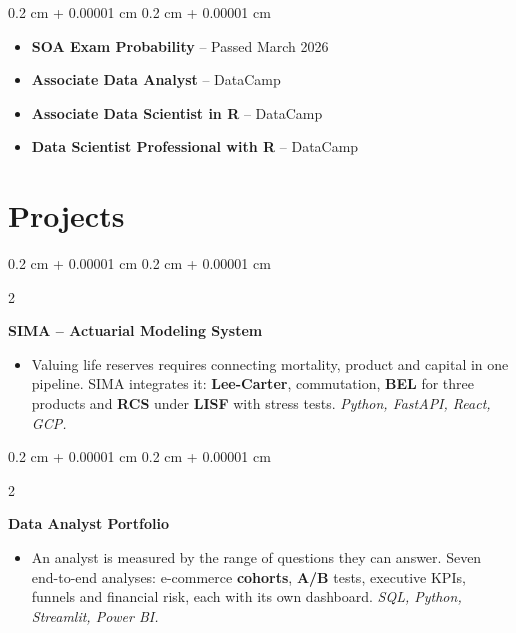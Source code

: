 \documentclass[10pt, letterpaper]{article}
\newenvironment{highlights}{
    \begin{itemize}[
        topsep=0.02 cm,
        parsep=0.05 cm,
        partopsep=0pt,
        itemsep=0pt,
        leftmargin=0.4 cm + 10pt
    ]
}{
    \end{itemize}
}
\newenvironment{highlightsforbulletentries}{
    \begin{itemize}[
        topsep=0.02 cm,
        parsep=0.02 cm,
        partopsep=0pt,
        itemsep=0pt,
        leftmargin=10pt
    ]
}{
    \end{itemize}
}
\newenvironment{onecolentry}{
    \begin{adjustwidth}{
        0.2 cm + 0.00001 cm
    }{
        0.2 cm + 0.00001 cm
    }
}{
    \end{adjustwidth}
}
\newenvironment{twocolentrynarrow}[2][]{
    \onecolentry
    \def\secondColumn{#2}
    \setcolumnwidth{\fill, 2.2 cm}
    \begin{paracol}{2}
}{
    \switchcolumn \raggedleft \secondColumn
    \end{paracol}
    \endonecolentry
}
\newcommand{\hl}[1]{\textcolor{primaryColor}{\textbf{#1}}}
\let\hrefWithoutArrow\href
\renewcommand{\href}[2]{\hrefWithoutArrow{#1}{\ifthenelse{\equal{#2}{}}{ }{#2 }\raisebox{.15ex}{\footnotesize \faExternalLink*}}}
\begin{document}
    \begin{onecolentry}
        \begin{highlightsforbulletentries}
            \item \textbf{SOA Exam Probability} -- Passed March 2026 \href{https://drive.google.com/file/d/1rt3emgBnPpQi7NiXkBQeA5WwJTV0JuAf/view?usp=sharing}{}
            \item \textbf{Associate Data Analyst} -- DataCamp \href{https://drive.google.com/drive/folders/1-QUuVH3zPBPsl6RhUvuUWxpZkP1i8TYb?usp=sharing}{}
            \item \textbf{Associate Data Scientist in R} -- DataCamp \href{https://drive.google.com/file/d/1xVLk15A1LBbyXH1fZnd4eBTaJ4d8FLLO/view?usp=drive_link}{}
            \item \textbf{Data Scientist Professional with R} -- DataCamp \href{https://drive.google.com/file/d/1Woe6xqxofloFZ9uM2f5VsdGxY-WQWCRI/view?usp=drive_link}{}
        \end{highlightsforbulletentries}
    \end{onecolentry}


    \section{Projects}

\begin{twocolentrynarrow}{\href{https://sima-d3qj5vwxtq-uc.a.run.app}{app live}}
    \textbf{SIMA -- Actuarial Modeling System}
    \begin{highlights}
        \item Valuing life reserves requires connecting mortality, product and capital in one pipeline. SIMA integrates it: \hl{Lee-Carter}, commutation, \hl{BEL} for three products and \hl{RCS} under \hl{LISF} with stress tests. \textit{Python, FastAPI, React, GCP.}
    \end{highlights}
\end{twocolentrynarrow}

\vspace{0.01 cm}

\begin{twocolentrynarrow}{\href{https://gonorandres.github.io/blog/data-analyst-portfolio/}{blog}}
    \textbf{Data Analyst Portfolio}
    \begin{highlights}
        \item An analyst is measured by the range of questions they can answer. Seven end-to-end analyses: e-commerce \hl{cohorts}, \hl{A/B} tests, executive KPIs, funnels and financial risk, each with its own dashboard. \textit{SQL, Python, Streamlit, Power BI.}
    \end{highlights}
\end{twocolentrynarrow}
\end{document}
